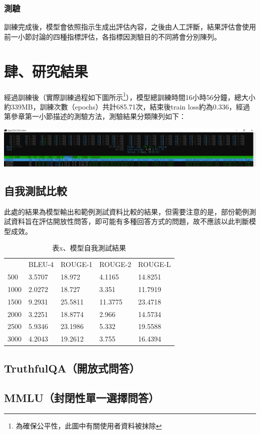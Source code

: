 \documentclass[8pt,a4paper,新細明體,UTF8,natbib]{article}
\begin{document}
\begin{CJK*}{UTF8}{bsmi}
	\subsubsection{測驗}
	訓練完成後，模型會依照指示生成出評估內容，之後由人工評斷，結果評估會使用前一小節討論的四種指標評估，各指標因測驗目的不同將會分別陳列。
	\section{肆、研究結果}
	經過訓練後（實際訓練過程如下圖所示\footnote{為確保公平性，此圖中有關使用者資料被抹除}），模型總訓練時間16小時56分鐘，總大小約339MB，訓練次數（epochs）共計685.71次，結束後train loss約為0.336，經過第參章第一小節描述的測驗方法，測驗結果分類陳列如下：%
	
	\includegraphics[width=\textwidth]{running}
	\subsection{自我測試比較}
	此處的結果為模型輸出和範例測試資料比較的結果，但需要注意的是，部份範例測試資料旨在評估開放性問答，即可能有多種回答方式的問題，故不應該以此判斷模型成效。
	\begin{table}[H]
		\centering
		\caption{表x、模型自我測試結果}
		\begin{tabular}{lllll}
			& BLEU-4 & ROUGE-1 & ROUGE-2 & ROUGE-L  \\
			500  & 3.5707 & 18.972  & 4.1165  & 14.8251  \\
			1000 & 2.0272 & 18.727  & 3.351   & 11.7919  \\
			1500 & 9.2931 & 25.5811 & 11.3775 & 23.4718  \\
			2000 & 3.2251 & 18.8774 & 2.966   & 14.5734  \\
			2500 & 5.9346 & 23.1986 & 5.332   & 19.5588  \\
			3000 & 4.2043 & 19.2612 & 3.755   & 16.4394 
		\end{tabular}
	\end{table}
	\subsection{TruthfulQA（開放式問答）}
	\subsection{MMLU（封閉性單一選擇問答）}

\end{CJK*}
\end{document}
